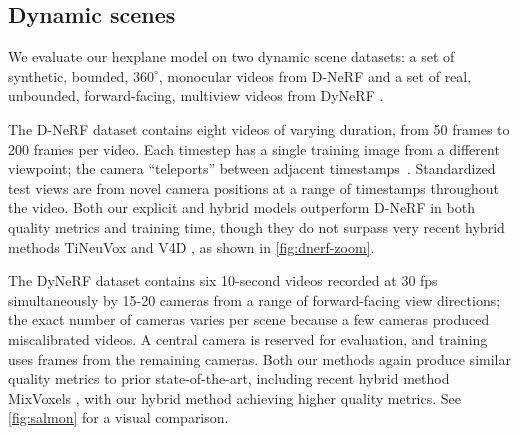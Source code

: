 \documentclass[10pt,twocolumn,letterpaper]{article}
\begin{document}
\subsection{Dynamic scenes}
\label{sec:video}



We evaluate our hexplane model on two dynamic scene datasets: a set of synthetic, bounded, $360^{\circ}$, monocular videos from D-NeRF \cite{dnerf} and a set of real, unbounded, forward-facing, multiview videos from DyNeRF \cite{dynerf}.
 

The D-NeRF dataset contains eight videos of varying duration, from 50 frames to 200 frames per video. Each timestep has a single training image from a different viewpoint; the camera ``teleports'' between adjacent timestamps~\cite{gao22teleport}. Standardized test views are from novel camera positions at a range of timestamps throughout the video. Both our explicit and hybrid models outperform D-NeRF in both quality metrics and training time, though they do not surpass very recent hybrid methods TiNeuVox \cite{tineuvox} and V4D \cite{v4d}, as shown in \cref{fig:dnerf-zoom}.

The DyNeRF dataset contains six 10-second videos recorded at 30 fps simultaneously by 15-20 cameras from a range of forward-facing view directions; the exact number of cameras varies per scene because a few cameras produced miscalibrated videos. A central camera is reserved for evaluation, and training uses frames from the remaining cameras. Both our methods again produce similar quality metrics to prior state-of-the-art, including recent hybrid method MixVoxels \cite{mixvoxels}, with our hybrid method achieving higher quality metrics. See \cref{fig:salmon} for a visual comparison.
\end{document}
